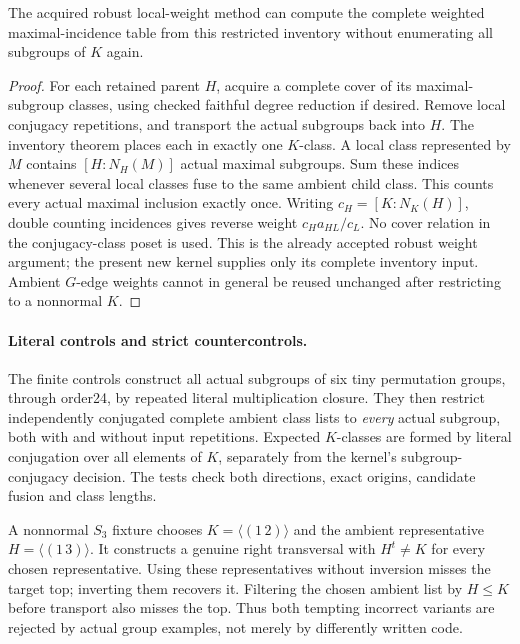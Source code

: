 \documentclass[11pt]{article}
\begin{document}
\begin{corollary}
The acquired robust local-weight method can compute the complete weighted
maximal-incidence table from this restricted inventory without enumerating
all subgroups of $K$ again.
\end{corollary}
\begin{proof}
For each retained parent $H$, acquire a complete cover of its maximal-subgroup
classes, using checked faithful degree reduction if desired. Remove local
conjugacy repetitions, and transport the actual subgroups back into $H$.
The inventory theorem places each in exactly one $K$-class. A local class
represented by $M$ contains $[H:N_H(M)]$ actual maximal subgroups. Sum these
indices whenever several local classes fuse to the same ambient child class.
This counts every actual maximal inclusion exactly once.
Writing $c_H=[K:N_K(H)]$, double counting incidences gives reverse weight
$c_H a_{HL}/c_L$. No cover relation in the conjugacy-class poset is used.
This is the already accepted robust weight argument; the present new kernel
supplies only its complete inventory input. Ambient $G$-edge weights cannot
in general be reused unchanged after restricting to a nonnormal $K$.
\end{proof}

\paragraph{Literal controls and strict countercontrols.}
The finite controls construct all actual subgroups of six tiny permutation
groups, through order24, by repeated literal multiplication closure. They
then restrict independently conjugated complete ambient class lists to
\emph{every} actual subgroup, both with and without input repetitions.
Expected $K$-classes are formed by literal conjugation over all elements
of $K$, separately from the kernel's subgroup-conjugacy decision. The tests
check both directions, exact origins, candidate fusion and class lengths.

A nonnormal $S_3$ fixture chooses $K=\langle(1\,2)\rangle$ and the
ambient representative $H=\langle(1\,3)\rangle$. It constructs a genuine
right transversal with $H^t\ne K$ for every chosen representative.
Using these representatives without inversion misses the target top;
inverting them recovers it. Filtering the chosen ambient list by $H\leq K$
before transport also misses the top. Thus both tempting incorrect variants
are rejected by actual group examples, not merely by differently written code.
\end{document}

